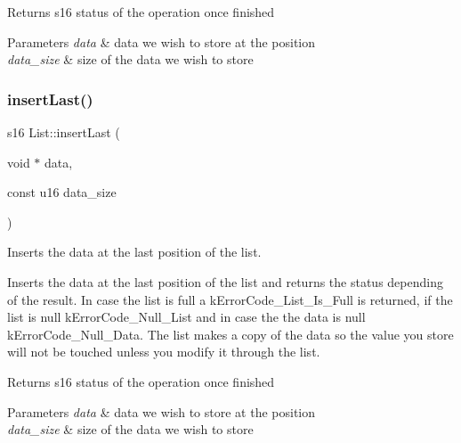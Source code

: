 \begin{DoxyReturn}{Returns}
s16 status of the operation once finished 
\end{DoxyReturn}

\begin{DoxyParams}{Parameters}
{\em data} & data we wish to store at the position \\
\hline
{\em data\+\_\+size} & size of the data we wish to store \\
\hline
\end{DoxyParams}
\mbox{\label{class_list_a14628aaa4a0681ea51e170c5badc998a}} 
\subsubsection{\texorpdfstring{insert\+Last()}{insertLast()}}
{\footnotesize\ttfamily s16 List\+::insert\+Last (\begin{DoxyParamCaption}\item[{void $\ast$}]{data,  }\item[{const u16}]{data\+\_\+size }\end{DoxyParamCaption})}



Inserts the data at the last position of the list. 

Inserts the data at the last position of the list and returns the status depending of the result. In case the list is full a k\+Error\+Code\+\_\+\+List\+\_\+\+Is\+\_\+\+Full is returned, if the list is null k\+Error\+Code\+\_\+\+Null\+\_\+\+List and in case the the data is null k\+Error\+Code\+\_\+\+Null\+\_\+\+Data. The list makes a copy of the data so the value you store will not be touched unless you modify it through the list.

\begin{DoxyReturn}{Returns}
s16 status of the operation once finished 
\end{DoxyReturn}

\begin{DoxyParams}{Parameters}
{\em data} & data we wish to store at the position \\
\hline
{\em data\+\_\+size} & size of the data we wish to store \\
\hline
\end{DoxyParams}
\mbox{\label{class_list_a9009217d5542f230dc7276d4c954534e}} 
